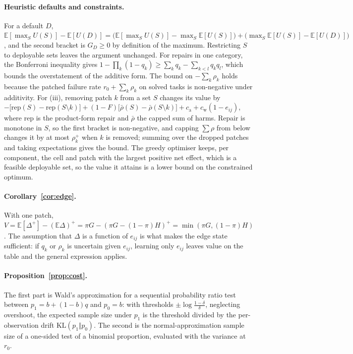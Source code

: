 \documentclass[11pt]{article}
\begin{document}
\paragraph{Heuristic defaults and constraints.} For a default $D$, $\mathbb E[\max_S U(S)]-\mathbb E[U(D)]=\big(\mathbb E[\max_S U(S)]-\max_S\mathbb E[U(S)]\big)+\big(\max_S\mathbb E[U(S)]-\mathbb E[U(D)]\big)$, and the second bracket is $G_D\ge0$ by definition of the maximum. Restricting $S$ to deployable sets leaves the argument unchanged. For repairs in one category, the Bonferroni inequality gives $1-\prod_k(1-q_k)\ge\sum_kq_k-\sum_{k<l}q_kq_l$, which bounds the overstatement of the additive form. The bound on $-\sum_k\rho_k$ holds because the patched failure rate $r_0+\sum_k\rho_k$ on solved tasks is non-negative under additivity. For (iii), removing patch $k$ from a set $S$ changes its value by $-\big[\mathrm{rep}(S)-\mathrm{rep}(S\setminus k)\big]+(1-F)\big[\bar\rho(S)-\bar\rho(S\setminus k)\big]+c_{\mathrm a}+c_{\mathrm w}(1-e_{ij})$, where $\mathrm{rep}$ is the product-form repair and $\bar\rho$ the capped sum of harms. Repair is monotone in $S$, so the first bracket is non-negative, and capping $\sum\rho$ from below changes it by at most $\rho_k^+$ when $k$ is removed; summing over the dropped patches and taking expectations gives the bound. The greedy optimiser keeps, per component, the cell and patch with the largest positive net effect, which is a feasible deployable set, so the value it attains is a lower bound on the constrained optimum.

\paragraph{Corollary~\ref{cor:edge}.} With one patch, $V=\mathbb E[\Delta^+]-(\mathbb E\Delta)^+=\pi G-(\pi G-(1-\pi)H)^+=\min(\pi G,(1-\pi)H)$. The assumption that $\Delta$ is a function of $e_{ij}$ is what makes the edge state sufficient: if $q_k$ or $\rho_k$ is uncertain given $e_{ij}$, learning only $e_{ij}$ leaves value on the table and the general expression applies.

\paragraph{Proposition~\ref{prop:cost}.} The first part is Wald's approximation for a sequential probability ratio test between $p_1=b+(1-b)q$ and $p_0=b$: with thresholds $\pm\log\frac{1-\delta}{\delta}$, neglecting overshoot, the expected sample size under $p_1$ is the threshold divided by the per-observation drift $\mathrm{KL}(p_1\Vert p_0)$. The second is the normal-approximation sample size of a one-sided test of a binomial proportion, evaluated with the variance at $r_0$.
\end{document}
